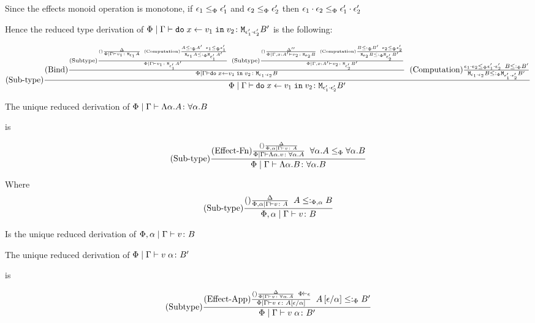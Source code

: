 \documentclass{report}
\begin{document}
    Since the effects monoid operation is monotone, if $\e_1\subeffectp\e_1'$ and $\e_2\subeffectp\e_2'$ then $\e_1\dot\e_2 \subeffectp \e_1'\dot\e_2'$

    Hence the reduced type derivation of $\gpetyperelation{\doin{x}{v_1}{v_2}}{\M{\e_1'\dot\e_2'}{B'}}$ is the following:

    \begin{equation}
        \treerule{Sub-type} {
            \treerule{Bind}{
                \edeltacrule{\G}{v_1}{\e_1}{A}{\e_1'}{A'}
                \s\s
                \edeltacruleprimeprime{\G, x:A'}{v_2}{\e_2}{B}{\e_2'}{B'}
            } {
                \gpetyperelation{\doin{x}{v_1}{v_2}}{\M{\e_1\dot\e_2}{B}}
            }
            \s\s
            \subeffecttree{\e_1\dot\e_2}{B}{\e_1'\dot\e_2'}{B'}
        } {
            \gpetyperelation{\doin{x}{v_1}{v_2}}{\M{\e_1'\dot\e_2'}{B'}}
        }
    \end{equation}


    The unique reduced derivation of $\gpetyperelation{\elam{\a}{A}}{\all{\a}{B}}$

    is 

    \begin{equation}
        \treerule{Sub-type}{
            \treerule{Effect-Fn}{
                \treerule{}{\D}{\etyperelation{\P,\a}{\G}{v}{A}}
            }{
                \gpetyperelation{\elam{\a}{v}}{\all{\a}{A}}
            }
            \s\s
            \all{\a}{A}\subeffectp\all{\a}{B}
        }{
            \gpetyperelation{\elam{\a}{B}}{\all{\a}{B}}
        }
    \end{equation}

    Where
    \begin{eqnarray}
        \treerule{Sub-type}{
            \treerule{}{\D}{\etyperelation{\P,\a}{\G}{v}{A}}
            \s\s
            A\subtypepa B
        }{
            \etyperelation{\P,\a}{\G}{v}{B}
        }
    \end{eqnarray}

    Is the unique reduced derivation of $\etyperelation{\P,\a}{\G}{v}{B}$

    The unique reduced derivation of $\gpetyperelation{\eapp{v}{\a}}{B'}$

    is 

    \begin{equation}
        \treerule{Subtype}{
            \treerule{Effect-App}{
                \treerule{}{\D}{\gpetyperelation{v}{\all{\a}{A}}}\s\s\wellformed{\P}{\e}
            }{\gpetyperelation{\eapp{v}{\e}}{A\ssub{\a}{\e}}}
            \s\s            
            A\ssub{\a}{\e}\subtypep B'
        }{\gpetyperelation{\eapp{v}{\a}}{B'}}
    \end{equation}
\end{document}
